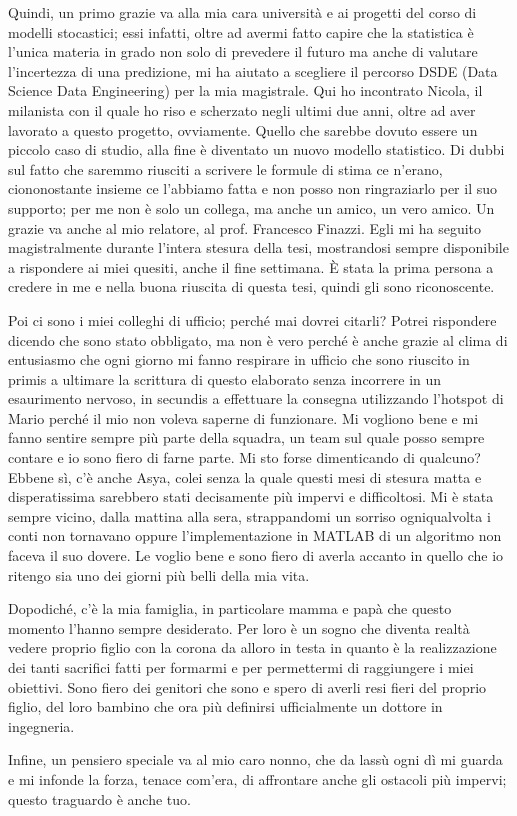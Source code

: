 \par Quindi, un primo grazie va alla mia cara università e ai progetti del corso di modelli stocastici; essi infatti, oltre ad avermi fatto capire che la statistica è l’unica materia in grado non solo di prevedere il futuro ma anche di valutare l’incertezza di una predizione, mi ha aiutato a scegliere il percorso DSDE (Data Science Data Engineering) per la mia magistrale. Qui ho incontrato Nicola, il milanista con il quale ho riso e scherzato negli ultimi due anni, oltre ad aver lavorato a questo progetto, ovviamente. Quello che sarebbe dovuto essere un piccolo caso di studio, alla fine è diventato un nuovo modello statistico. Di dubbi sul fatto che saremmo riusciti a scrivere le formule di stima ce n’erano, ciononostante insieme ce l’abbiamo fatta e non posso non ringraziarlo per il suo supporto; per me non è solo un collega, ma anche un amico, un vero amico.
Un grazie va anche al mio relatore, al prof. Francesco Finazzi. Egli mi ha seguito magistralmente durante l’intera stesura della tesi, mostrandosi sempre disponibile a rispondere ai miei quesiti, anche il fine settimana. È stata la prima persona a credere in me e nella buona riuscita di questa tesi, quindi gli sono riconoscente.
\par Poi ci sono i miei colleghi di ufficio; perché mai dovrei citarli? Potrei rispondere dicendo che sono stato obbligato, ma non è vero perché è anche grazie al clima di entusiasmo che ogni giorno mi fanno respirare in ufficio che sono riuscito in primis a ultimare la scrittura di questo elaborato senza incorrere in un esaurimento nervoso, in secundis a effettuare la consegna utilizzando l’hotspot di Mario perché il mio non voleva saperne di funzionare. Mi vogliono bene e mi fanno sentire sempre più parte della squadra, un team sul quale posso sempre contare e io sono fiero di farne parte.
Mi sto forse dimenticando di qualcuno? Ebbene sì, c’è anche Asya, colei senza la quale questi mesi di stesura matta e disperatissima sarebbero stati decisamente più impervi e difficoltosi. Mi è stata sempre vicino, dalla mattina alla sera, strappandomi un sorriso ogniqualvolta i conti non tornavano oppure l’implementazione in MATLAB di un algoritmo non faceva il suo dovere. Le voglio bene e sono fiero di averla accanto in quello che io ritengo sia uno dei giorni più belli della mia vita.
\par Dopodiché, c’è la mia famiglia, in particolare mamma e papà che questo momento l’hanno sempre desiderato. Per loro è un sogno che diventa realtà vedere proprio figlio con la corona da alloro in testa in quanto è la realizzazione dei tanti sacrifici fatti per formarmi e per permettermi di raggiungere i miei obiettivi. Sono fiero dei genitori che sono e spero di averli resi fieri del proprio figlio, del loro bambino che ora più definirsi ufficialmente un dottore in ingegneria.
\par Infine, un pensiero speciale va al mio caro nonno, che da lassù ogni dì mi guarda e mi infonde la forza, tenace com’era, di affrontare anche gli ostacoli più impervi; questo traguardo è anche tuo.